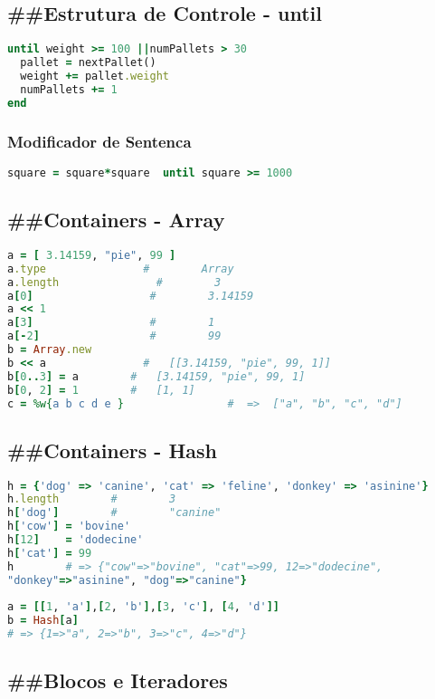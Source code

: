 \documentclass[serif,mathserif]{article}
\begin{document}
\subsection{\#\#Estrutura de Controle -  until} 
\begin{lstlisting}[language=ruby]
until weight >= 100 ||numPallets > 30
  pallet = nextPallet()
  weight += pallet.weight
  numPallets += 1
end
\end{lstlisting}

\subsubsection {Modificador de Sentenca}
\begin{lstlisting}[language=ruby]
square = square*square  until square >= 1000
\end{lstlisting}

\subsection{\#\#Containers - Array}
\begin{lstlisting}[language=ruby]
a = [ 3.14159, "pie", 99 ]
a.type               #        Array
a.length               #        3
a[0]                  #        3.14159
a << 1
a[3]                  #        1
a[-2]                 #        99
b = Array.new
b << a               #   [[3.14159, "pie", 99, 1]]
b[0..3] = a        #   [3.14159, "pie", 99, 1]
b[0, 2] = 1        #   [1, 1]
c = %w{a b c d e }                #  =>  ["a", "b", "c", "d"]
\end{lstlisting}


\subsection{\#\#Containers - Hash}
\begin{lstlisting}[language=ruby]
h = {'dog' => 'canine', 'cat' => 'feline', 'donkey' => 'asinine'}
h.length        #        3
h['dog']        #        "canine"
h['cow'] = 'bovine'
h[12]    = 'dodecine'
h['cat'] = 99
h        # => {"cow"=>"bovine", "cat"=>99, 12=>"dodecine",
"donkey"=>"asinine", "dog"=>"canine"}
  
a = [[1, 'a'],[2, 'b'],[3, 'c'], [4, 'd']]
b = Hash[a]
# => {1=>"a", 2=>"b", 3=>"c", 4=>"d"}
\end{lstlisting}


\subsection{\#\#Blocos e Iteradores}
\end{document}
